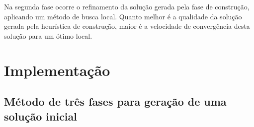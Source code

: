 \documentclass[12pt,a4paper]{article}
\begin{document}

Na segunda fase ocorre o refinamento da solução gerada pela fase de construção, aplicando um método de busca local. Quanto melhor é a qualidade da solução gerada pela heurística de construção, maior é a velocidade de convergência desta solução para um ótimo local.


\section{Implementação}

\subsection{Método de três fases para geração de uma solução inicial}
\end{document}
